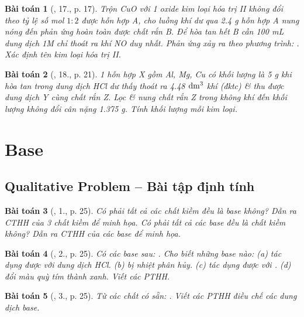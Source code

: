 \documentclass{article}
\newtheorem{baitoan}{Bài toán}
\begin{document}
\begin{baitoan}[\cite{An_350_BT_Hoa_Hoc_9}, 17., p. 17]
	Trộn \emph{CuO} với 1 oxide kim loại hóa trị II không đổi theo tỷ lệ số mol $1:2$ được hỗn hợp A, cho luồng khí \emph{} dư qua \emph{2.4 g} hỗn hợp A nung nóng đến phản ứng hoàn toàn được chất rắn B. Để hòa tan hết B cần \emph{100 mL} dung dịch \emph{ 1M} chỉ thoát ra khí \emph{NO} duy nhất. Phản ứng xảy ra theo phương trình: \emph{}. Xác định tên kim loại hóa trị II.
\end{baitoan}

\begin{baitoan}[\cite{An_350_BT_Hoa_Hoc_9}, 18., p. 21]
	1 hỗn hợp X gồm \emph{Al, Mg, Cu} có khối lượng là \emph{5 g} khi hòa tan trong dung dịch \emph{HCl} dư thấy thoát ra \emph{4.48 $\rm dm^3$} khí (đktc) \& thu được dung dịch Y cùng chất rắn Z. Lọc \& nung chất rắn Z trong không khí đến khối lượng không đổi cân nặng \emph{1.375 g}. Tính khối lượng mỗi kim loại.
\end{baitoan}


\section{Base}

\subsection{Qualitative Problem -- Bài tập định tính}

\begin{baitoan}[\cite{SGK_Hoa_Hoc_9}, 1., p. 25]
	Có phải tất cả các chất kiềm đều là base không? Dẫn ra CTHH của 3 chất kiềm để minh họa. Có phải tất cả các base đều là chất kiềm không? Dẫn ra CTHH của các base để minh họa.
\end{baitoan}

\begin{baitoan}[\cite{SGK_Hoa_Hoc_9}, 2., p. 25]
	Có các base sau: \emph{}. Cho biết những base nào: (a) tác dụng được với dung dịch \emph{HCl}. (b) bị nhiệt phân hủy. (c) tác dụng được với \emph{}. (d) đổi màu quỳ tím thành xanh. Viết các PTHH.
\end{baitoan}

\begin{baitoan}[\cite{SGK_Hoa_Hoc_9}, 3., p. 25]
	Từ các chất có sẵn: \emph{}. Viết các PTHH điều chế các dung dịch base.
\end{baitoan}
\end{document}
